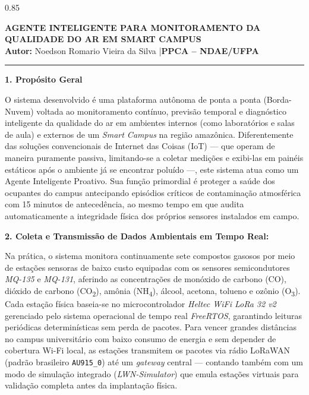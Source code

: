 \documentclass[11pt, a4paper]{article}
\begin{document}
\pagestyle{empty}

\begin{spacing}{0.85}
\setlength{\parskip}{0.02cm}

\begin{center}
    {\large\bfseries AGENTE INTELIGENTE PARA MONITORAMENTO DA QUALIDADE DO AR EM SMART CAMPUS}\\[0.08cm]
    {\small\textbf{Autor:} Noedson Romario Vieira da Silva \quad|\quad \textbf{PPCA -- NDAE/UFPA}}
    \vspace{0.04cm}
    \hrule
\end{center}

\vspace{0.04cm}

\noindent\textbf{1. Propósito Geral}\par
O sistema desenvolvido é uma plataforma autônoma de ponta a ponta (Borda-Nuvem) 
voltada ao monitoramento contínuo, previsão temporal e diagnóstico inteligente da qualidade do ar
em ambientes internos (como laboratórios e salas de aula) 
e externos de um \emph{Smart Campus} na região amazônica. Diferentemente 
das soluções convencionais de Internet das Coisas (IoT) --- que operam de
maneira puramente passiva, limitando-se a coletar medições e exibi-las em painéis 
estáticos após o ambiente já se encontrar poluído ---, este sistema atua como um 
Agente Inteligente Proativo. Sua função primordial é 
proteger a saúde dos ocupantes do campus antecipando episódios críticos de contaminação 
atmosférica com 15 minutos de antecedência, ao mesmo 
tempo em que audita automaticamente a integridade física dos próprios sensores instalados em campo.

\vspace{0.04cm}
\noindent\textbf{2. Coleta e Transmissão de Dados Ambientais em Tempo Real:}\par
Na prática, o sistema monitora continuamente sete compostos gasosos
por meio de estações sensoras de baixo custo equipadas com os sensores semicondutores 
\emph{MQ-135} e \emph{MQ-131}, aferindo as concentrações de 
monóxido de carbono (CO), dióxido de carbono (CO\textsubscript{2}), amônia (NH\textsubscript{4}), álcool, 
acetona, tolueno e ozônio (O\textsubscript{3}). Cada estação física baseia-se no microcontrolador 
\emph{Heltec WiFi LoRa 32 v2} gerenciado pelo sistema operacional de tempo real \emph{FreeRTOS}, 
garantindo leituras periódicas determinísticas sem perda de pacotes. Para vencer grandes distâncias no 
campus universitário com baixo consumo de energia e sem depender de cobertura Wi-Fi local, as 
estações transmitem os pacotes via rádio LoRaWAN (padrão brasileiro 
\texttt{AU915\_0}) até um \emph{gateway} central --- contando também com um modo de simulação 
integrado (\emph{LWN-Simulator}) que emula estações virtuais para validação completa antes da 
implantação física.


\end{spacing}
\end{document}

